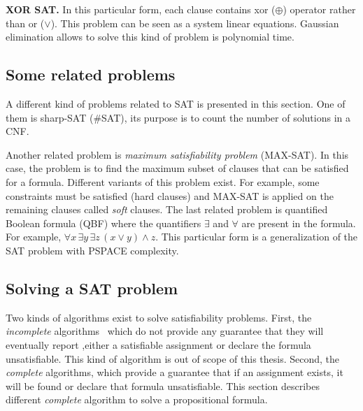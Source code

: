 \textbf{XOR SAT.} In this particular form, each clause contains xor ($\oplus$) operator rather than or ($\lor$).
This problem can be seen as a system linear equations. Gaussian elimination allows to solve this kind of
problem is polynomial time.
\subsection{Some related problems}
A different kind of problems related to SAT is presented in this section.
One of them is sharp-SAT (\#SAT), its purpose is to count the number of solutions in a CNF.

Another related problem is \textit{maximum satisfiability problem} (MAX-SAT). In this case, the problem
is to find the maximum subset of clauses that can be satisfied for a formula. Different variants
of this problem exist. For example, some constraints must be satisfied (hard clauses) and MAX-SAT
is applied on the remaining clauses called \emph{soft} clauses.
The last related problem is quantified Boolean formula (QBF) where the quantifiers $\exists$ and
$\forall$ are present in the formula. For example, $\forall x\, \exists y\, \exists z \, (x \lor y) \land z$.
This particular form is a generalization of the SAT problem with PSPACE complexity.
\subsection{Solving a SAT problem}
Two kinds of algorithms exist to solve satisfiability problems.
First, the \emph{incomplete} algorithms~\cite{kautz2009incomplete} which do not provide any guarantee that they will eventually report ,either a satisfiable assignment or declare the formula unsatisfiable. This kind of algorithm is out of scope of this thesis. 
Second, the \emph{complete} algorithms, which provide a guarantee that if an assignment exists,
it will be found or declare that formula unsatisfiable.
This section describes different \emph{complete }algorithm to solve a propositional formula.

